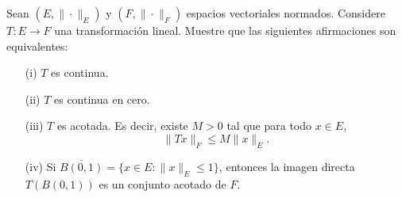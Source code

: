 Sean $(E, \| \cdot \|_E)$ y $(F, \| \cdot \|_F)$ espacios vectoriales normados. Considere  
$T : E \to F$ una transformación lineal. Muestre que las siguientes afirmaciones son equivalentes:
\begin{enumerate}
    \item[(i)] $T$ es continua.
    \item[(ii)] $T$ es continua en cero.
    \item[(iii)] $T$ es acotada. Es decir, existe $M > 0$ tal que para todo $x \in E$,  
    \[
    \|T x\|_F \leq M \|x\|_E.
    \]
    \item[(iv)] Si $\overline{B(0,1)} = \{x \in E : \|x\|_E \leq 1\}$, entonces la imagen directa $T(B(0,1))$ es un conjunto acotado de $F$.
\end{enumerate}
